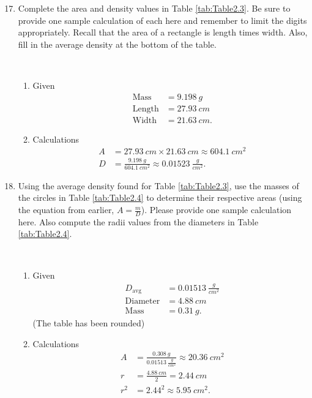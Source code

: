 \begin{enumerate}
	\setcounter{enumi}{16}
	\item Complete the area and density values in Table \ref{tab:Table2.3}. Be sure to provide one sample calculation of each here and remember to limit the digits appropriately. Recall that the area of a rectangle is length times width. Also, fill in the average density at the bottom of the table.
	      \begin{remark}[Sample Calculation]~
		      \begin{enumerate}[label=\alph*.]
			      \item Given
			            \begin{align*}
				            \text{Mass} &= \SI{9.198}{g} \\
				            \text{Length} &= \SI{27.93}{cm} \\
				            \text{Width} &= \SI{21.63}{cm}
				            .\end{align*}
			      \item Calculations
			            \begin{align*}
				            A &= \SI{27.93}{cm} \times \SI{21.63}{cm} \approx \SI{604.1}{cm^2} \\
				            D &= \frac{\SI{9.198}{g}}{\SI{604.1}{cm^2}} \approx \SI{0.01523}{\frac{g}{cm^2}}
				            .\end{align*}
		      \end{enumerate}
	      \end{remark}

	\item Using the average density found for Table \ref{tab:Table2.3}, use the masses of the circles in Table \ref{tab:Table2.4} to determine their respective areas (using the equation from earlier, $A = \frac{m}{D}$). Please provide one sample calculation here. Also compute the radii values from the diameters in Table \ref{tab:Table2.4}.
	      \begin{remark}~
		      \begin{enumerate}[label=\alph*.]
			      \item Given
			            \begin{align*}
				            D_{\mathrm{avg}} &= \SI{0.01513}{\frac{g}{cm^2}} \\
				            \text{Diameter} &= \SI{4.88}{cm} \\
				            \text{Mass} &= \SI{0.31}{g}
				            .\end{align*}
			            (The table has been rounded)
			      \item Calculations
			            \begin{align*}
				            A &= \frac{\SI{0.308}{g}}{\SI{0.01513}{\frac{g}{cm^2}}} \approx \SI{20.36}{cm^2} \\
				            r &= \frac{\SI{4.88}{cm}}{2} = \SI{2.44}{cm} \\
				            r^2 &= 2.44^2 \approx \SI{5.95}{cm^2}
				            .\end{align*}
		      \end{enumerate}
	      \end{remark}


\end{enumerate}
